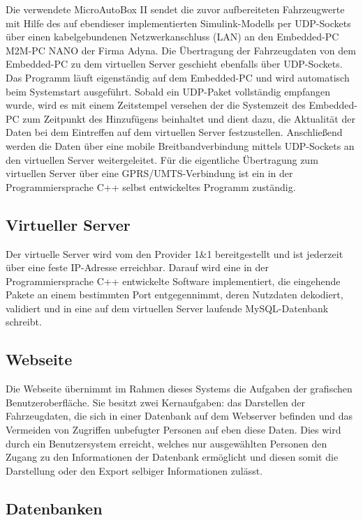 \documentclass[fontsize = 12pt, paper = a4]{scrreprt}
\begin{document}
Die verwendete MicroAutoBox II sendet die zuvor aufbereiteten Fahrzeugwerte mit Hilfe des auf ebendieser implementierten Simulink-Modells per UDP-Sockets über einen kabelgebundenen Netzwerkanschluss (LAN) an den Embedded-PC M2M-PC NANO der Firma Adyna. Die Übertragung der Fahrzeugdaten von dem Embedded-PC zu dem virtuellen Server geschieht ebenfalls über UDP-Sockets. Das Programm läuft eigenständig auf dem Embedded-PC und wird automatisch beim Systemstart ausgeführt. Sobald ein UDP-Paket vollständig empfangen wurde, wird es mit einem Zeitstempel versehen der die Systemzeit des Embedded-PC zum Zeitpunkt des Hinzufügens beinhaltet und dient dazu, die Aktualität der Daten bei dem Eintreffen auf dem virtuellen Server festzustellen. Anschließend werden die Daten über eine mobile Breitbandverbindung mittels UDP-Sockets an den virtuellen Server weitergeleitet. Für die eigentliche Übertragung zum virtuellen Server über eine GPRS/UMTS-Verbindung ist ein in der Programmiersprache C++ selbst entwickeltes Programm zuständig.		

\subsection{Virtueller Server}

Der virtuelle Server wird vom den Provider 1\&1 bereitgestellt und ist jederzeit über eine feste IP-Adresse erreichbar. Darauf wird eine in der Programmiersprache C++ entwickelte Software implementiert, die eingehende Pakete an einem bestimmten Port entgegennimmt, deren Nutzdaten dekodiert, validiert und in eine auf dem virtuellen Server laufende MySQL-Datenbank schreibt. 

\subsection{Webseite}

Die Webseite übernimmt im Rahmen dieses Systems die Aufgaben der grafischen Benutzeroberfläche. Sie besitzt zwei Kernaufgaben: das Darstellen der Fahrzeugdaten, die sich in einer Datenbank auf dem Webserver befinden und das Vermeiden von Zugriffen unbefugter Personen auf eben diese Daten. Dies wird durch ein Benutzersystem erreicht, welches nur ausgewählten Personen den Zugang zu den Informationen der Datenbank ermöglicht und diesen somit die Darstellung oder den Export selbiger Informationen zulässt.

\subsection{Datenbanken}
\end{document}
